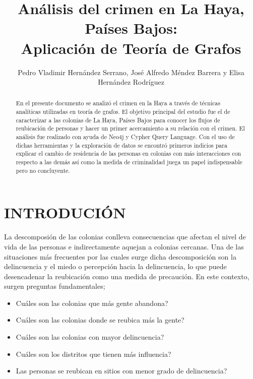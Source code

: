 \documentclass[letterpaper, 10 pt, conference]{ieeeconf}  %
\title{\LARGE \bf
An\'alisis del crimen en La Haya, Pa\'ises Bajos: \\
Aplicaci\'on de Teor\'ia de Grafos 
}
\author{Pedro Vladimir Hern\'andez Serrano, Jos\'e Alfredo M\'endez Barrera y Elisa Hern\'andez Rodr\'iguez %
}
\begin{document}
\maketitle
\thispagestyle{empty}
\pagestyle{empty}


\begin{abstract}

En el presente documento se analiz\'o el crimen en la Haya a trav\'es de t\'ecnicas anal\'iticas utilizadas en teor\'ia de grafos. El objetivo principal del estudio fue el de caracterizar a las colonias de La Haya, Pa\'ises Bajos para conocer los flujos de reubicaci\'on de personas y hacer un primer acercamiento a su relaci\'on con el crimen. El análisis fue realizado con ayuda de Neo4j y Cypher Query Language. Con el uso de dichas herramientas y la exploraci\'on de datos se encontr\'o primeros indicios para explicar el cambio de residencia de las personas en colonias con m\'as interacciones con respecto a las dem\'as as\'i como la medida de criminalidad juega un papel indispensable pero no concluyente. 

\end{abstract}

\section{INTRODUCI\'ON}
\vspace{2mm}
La descomposi\'on de las colonias conlleva consecuencias que afectan el nivel de vida de las personas e indirectamente aquejan a colonias cercanas. Una de las situaciones m\'as frecuentes por las cuales surge dicha descomposici\'on  son la delincuencia y el miedo o percepci\'on hacia la delincuencia, lo que puede desencadenar la reubicaci\'on como una medida de precauci\'on. En este contexto, surgen preguntas fundamentales;

\begin{itemize}
\item \textquestiondown Cu\'ales son las colonias que m\'as gente abandona?
\item \textquestiondown Cu\'ales son las colonias donde se reubica m\'as la gente?
\item \textquestiondown Cu\'ales son las colonias con mayor delincuencia?
\item \textquestiondown Cu\'ales son los distritos que tienen m\'as influencia?
\item \textquestiondown Las personas se reubican en sitios con menor grado de delincuencia?
\end{itemize}
\end{document}
